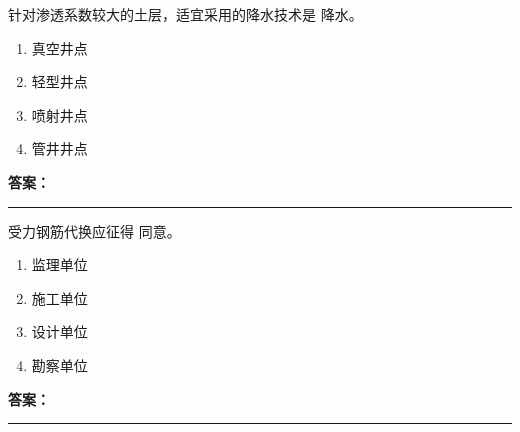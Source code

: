 \documentclass[UTF8,fontset=fandol,11pt]{ctexart}
\newcommand{\answerline}{\textcolor{answerred}{\rule{2.4cm}{0.7pt}}}
\begin{document}
\begin{quizbox}[title={乱序第 115 题｜第三章基坑工程}]

针对渗透系数较大的土层，适宜采用的降水技术是 降水。\\

\begin{enumerate}[label=\Alph*.]

\item 真空井点

\item 轻型井点

\item 喷射井点

\item 管井井点

\end{enumerate}

\textbf{\textcolor{answerred}{答案：}} \answerline

\end{quizbox}

\vspace{0.2em}

\begin{quizbox}[title={乱序第 116 题｜第四章混凝土结构工程}]

受力钢筋代换应征得 同意。\\

\begin{enumerate}[label=\Alph*.]

\item 监理单位

\item 施工单位

\item 设计单位

\item 勘察单位

\end{enumerate}

\textbf{\textcolor{answerred}{答案：}} \answerline

\end{quizbox}

\vspace{0.2em}
\end{document}

